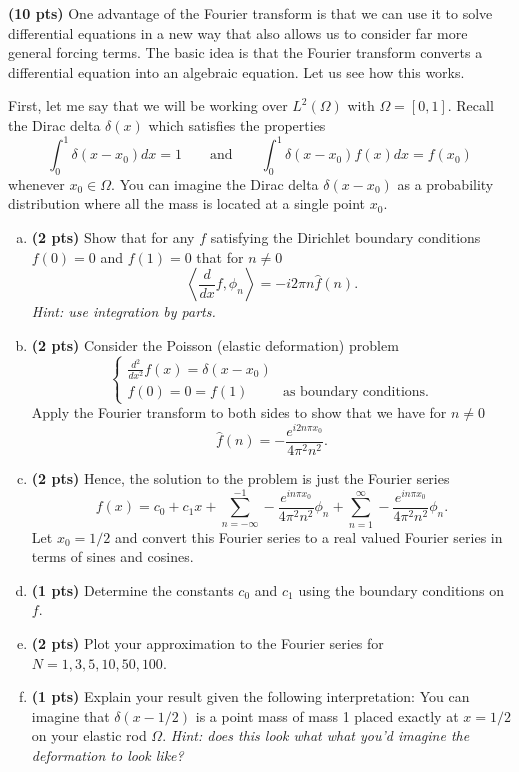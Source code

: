 \documentclass[12pt]{article} %
\begin{document}
\newpage
\begin{problem}
\textbf{(10 pts)} One advantage of the Fourier transform is that we can use it to solve differential equations in a new way that also allows us to consider far more general forcing terms. The basic idea is that the Fourier transform converts a differential equation into an algebraic equation. Let us see how this works.

First, let me say that we will be working over $L^2(\Omega)$ with $\Omega = [0,1]$. Recall the Dirac delta $\delta(x)$ which satisfies the properties
\[
\int_0^1 \delta(x-x_0) dx = 1 \qquad \textrm{and} \qquad \int_0^1 \delta(x-x_0) f(x) dx = f(x_0)
\]
whenever $x_0 \in \Omega$. You can imagine the Dirac delta $\delta(x- x_0)$ as a probability distribution where all the mass is located at a single point $x_0$.
\begin{enumerate}[(a)]
\item \textbf{(2 pts)} Show that for any $f$ satisfying the Dirichlet boundary conditions $f(0)=0$ and $f(1)=0$ that for $n\neq 0$
\[
\left\langle \frac{d}{dx} f , \phi_n \right\rangle = -i2 \pi n \hat{f}(n).
\]
\emph{Hint: use integration by parts.}
\item \textbf{(2 pts)} Consider the Poisson (elastic deformation) problem
\[
\begin{cases}
\frac{d^2}{dx^2} f(x) = \delta(x-x_0) \\
f(0)=0=f(1) & \textrm{as boundary conditions.}
\end{cases}
\]
Apply the Fourier transform to both sides to show that we have for $n\neq 0$
\[
\hat{f}(n) =  -\frac{e^{i2n\pi x_0}}{4\pi^2 n^2}.
\]
\item \textbf{(2 pts)} Hence, the solution to the problem is just the Fourier series
\[
f(x)=c_0 + c_1 x + \sum_{n=-\infty}^{-1} -\frac{e^{in \pi x_0}}{4\pi^2 n^2} \phi_n + \sum_{n=1}^\infty -\frac{e^{in \pi x_0}}{4\pi^2 n^2} \phi_n.
\]
Let $x_0=1/2$ and convert this Fourier series to a real valued Fourier series in terms of sines and cosines. 
\item \textbf{(1 pts)} Determine the constants $c_0$ and $c_1$ using the boundary conditions on $f$.
\item \textbf{(2 pts)} Plot your approximation to the Fourier series for $N=1,3,5,10,50,100$. 
\item \textbf{(1 pts)} Explain your result given the following interpretation: You can imagine that $\delta(x-1/2)$ is a point mass of mass 1 placed exactly at $x=1/2$ on your elastic rod $\Omega$. \emph{Hint: does this look what what you'd imagine the deformation to look like?}
\end{enumerate}
\end{problem}
\end{document}
